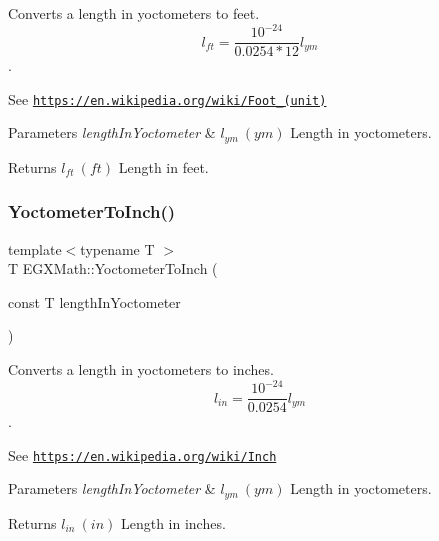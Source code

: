 Converts a length in yoctometers to feet. \[ l_{ft}= \frac{10^{-24}}{0.0254 * 12} l_{ym} \]. 

See \href{https://en.wikipedia.org/wiki/Foot_(unit)}{\tt https\+://en.\+wikipedia.\+org/wiki/\+Foot\+\_\+(unit)} 
\begin{DoxyParams}{Parameters}
{\em length\+In\+Yoctometer} & $ l_{ym}\ (ym)$ Length in yoctometers. \\
\hline
\end{DoxyParams}
\begin{DoxyReturn}{Returns}
$ l_{ft}\ (ft)$ Length in feet. 
\end{DoxyReturn}
\mbox{\label{group___e_g_x_math-_conversions-_length_conversions-_yoctometer-_imperial_gaaaba7544cf3189cd374782786a13646c}} 
\subsubsection{\texorpdfstring{Yoctometer\+To\+Inch()}{YoctometerToInch()}}
{\footnotesize\ttfamily template$<$typename T $>$ \\
T E\+G\+X\+Math\+::\+Yoctometer\+To\+Inch (\begin{DoxyParamCaption}\item[{const T}]{length\+In\+Yoctometer }\end{DoxyParamCaption})}



Converts a length in yoctometers to inches. \[ l_{in}= \frac{10^{-24}}{0.0254} l_{ym} \]. 

See \href{https://en.wikipedia.org/wiki/Inch}{\tt https\+://en.\+wikipedia.\+org/wiki/\+Inch} 
\begin{DoxyParams}{Parameters}
{\em length\+In\+Yoctometer} & $ l_{ym}\ (ym)$ Length in yoctometers. \\
\hline
\end{DoxyParams}
\begin{DoxyReturn}{Returns}
$ l_{in}\ (in)$ Length in inches. 
\end{DoxyReturn}
\mbox{\label{group___e_g_x_math-_conversions-_length_conversions-_yoctometer-_imperial_gacb2a1154ec79cfd130de96e92dfeedfa}} 
